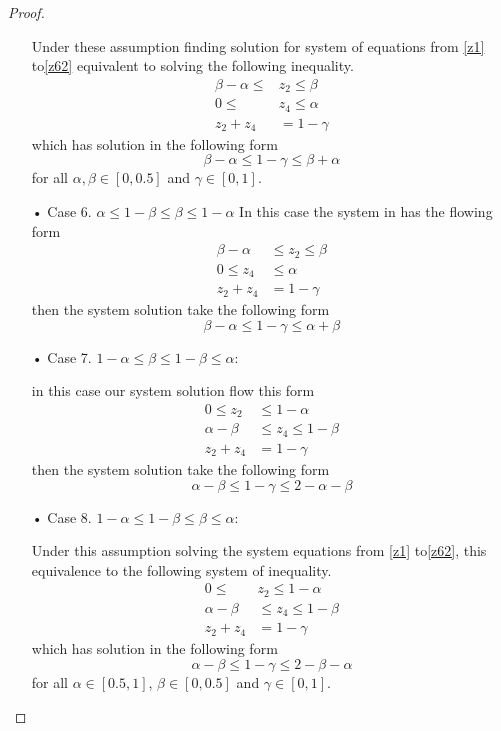 \begin{proof}
\begin{itemize}
Under these assumption finding solution for system of equations from \ref{z1} to\ref{z62} equivalent to solving the following inequality.
\begin{align*}
\beta-\alpha \leq &z_2 \leq \beta\\
0 \leq &z_4 \leq \alpha\\
z_2+z_4&=1-\gamma
\end{align*}
which has solution in the following form
\begin{equation}\label{zc5}
\beta-\alpha \leq1-\gamma \leq \beta+\alpha
\end{equation}
for all $\alpha,\beta \in [0,0.5]$ and $\gamma \in [0,1]$.
\item[• Case 6.]$\alpha\leq  1-\beta \leq \beta \leq 1-\alpha$
In this case the system in has the flowing form
\begin{align*}
\beta - \alpha&\leq z_2 \leq \beta\\
0 \leq z_4 &\leq \alpha\\
z_2+z_4&=1-\gamma
\end{align*}
then the system solution take the following form
\begin{equation}\label{zc6}
\beta-\alpha \leq 1-\gamma \leq \alpha+\beta
\end{equation}
\item[• Case 7.] $1-\alpha\leq  \beta \leq 1-\beta \leq \alpha$:

in this case our system solution flow this form
\begin{align*}
0\leq z_2&\leq 1-\alpha\\
\alpha-\beta &\leq z_4\leq 1-\beta\\
z_2+z_4&=1-\gamma
\end{align*}
then the system solution take the following form
\begin{equation}\label{zc7}
\alpha-\beta \leq 1-\gamma \leq 2-\alpha-\beta
\end{equation}
\item[• Case 8.] $1-\alpha\leq 1- \beta \leq \beta \leq \alpha$:

Under this assumption solving the system equations from \ref{z1} to\ref{z62}, this equivalence to the following system of inequality.
\begin{align*}
0 \leq &z_2 \leq 1-\alpha\\
 \alpha-\beta& \leq z_4 \leq1 -\beta\\
z_2+z_4&=1-\gamma
\end{align*}
which has solution in the following form
\begin{equation}\label{zc8}
\alpha-\beta \leq1-\gamma \leq 2-\beta-\alpha
\end{equation}
for all $\alpha \in [0.5,1]$, $\beta \in [0,0.5]$ and  $\gamma \in [0,1]$.
\end{itemize}


\end{proof}
